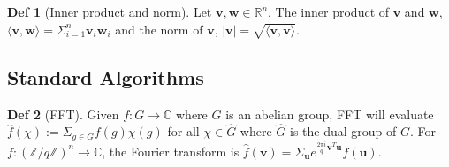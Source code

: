 \documentclass[a4paper, 10pt]{article}
\theoremstyle{definition}
\newtheorem{definition}{Def}[section]
\begin{document}
\begin{definition}[Inner product and norm]
    Let $\mathbf{v}, \mathbf{w} \in \mathbb{R}^n$. The inner product of $\mathbf{v}$ and $\mathbf{w}$, $\langle \mathbf{v}, \mathbf{w} \rangle = \Sigma_{i=1}^n \mathbf{v}_i \mathbf{w}_i$ and the norm of $\mathbf{v}$, $|\mathbf{v}| = \sqrt{\langle \mathbf{v}, \mathbf{v} \rangle}$.
\end{definition}

\subsection{Standard Algorithms}

\begin{definition}[\ac{FFT}]
    Given $f:G \rightarrow \mathbb{C}$ where $G$ is an abelian group, \ac{FFT} will evaluate $\hat{f}(\chi):=\Sigma _{g \in G}f(g)\chi (g)$ for all $\chi \in \hat{G}$ where $\hat{G}$ is the dual group of $G$. For $f:(\mathbb{Z}/q\mathbb{Z})^n \rightarrow \mathbb{C}$, the Fourier transform is $\hat{f}(\mathbf{v}) = \Sigma _\mathbf{u} e^{\frac{2 \pi i}{q}\mathbf{v}^T\mathbf{u}}f(\mathbf{u})$.
\end{definition}
\end{document}
